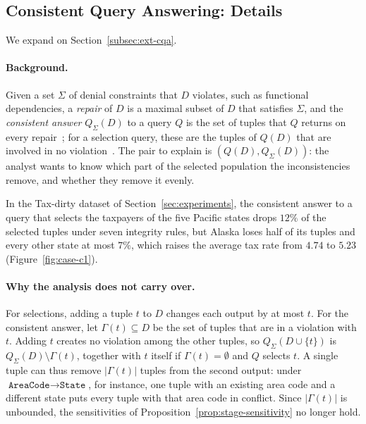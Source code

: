 \subsection{Consistent Query Answering: Details}
\label{app:cqa-details}

We expand on Section~\ref{subsec:ext-cqa}.

\paragraph{Background.}
Given a set $\Sigma$ of denial constraints that $D$ violates, such as functional dependencies, a \emph{repair} of $D$ is a maximal subset of $D$ that satisfies $\Sigma$, and the \emph{consistent answer} $Q_\Sigma(D)$ to a query $Q$ is the set of tuples that $Q$ returns on every repair~\cite{arenas1999,bertossi2006,bertossi2011}; for a selection query, these are the tuples of $Q(D)$ that are involved in no violation~\cite{chomicki2004}.
The pair to explain is $(Q(D),Q_\Sigma(D))$: the analyst wants to know which part of the selected population the inconsistencies remove, and whether they remove it evenly.

\begin{example}
\label{ex:cqa}
In the Tax-dirty dataset of Section~\ref{sec:experiments}, the consistent answer to a query that selects the taxpayers of the five Pacific states drops $12\%$ of the selected tuples under seven integrity rules, but Alaska loses half of its tuples and every other state at most $7\%$, which raises the average tax rate from $4.74$ to $5.23$ (Figure~\ref{fig:case-c1}).
\end{example}

\paragraph{Why the analysis does not carry over.}
For selections, adding a tuple $t$ to $D$ changes each output by at most $t$.
For the consistent answer, let $\Gamma(t)\subseteq D$ be the set of tuples that are in a violation with $t$.
Adding $t$ creates no violation among the other tuples, so $Q_\Sigma(D\cup\{t\})$ is $Q_\Sigma(D)\setminus\Gamma(t)$, together with $t$ itself if $\Gamma(t)=\emptyset$ and $Q$ selects $t$.
A single tuple can thus remove $|\Gamma(t)|$ tuples from the second output: under $\texttt{AreaCode}\to\texttt{State}$, for instance, one tuple with an existing area code and a different state puts every tuple with that area code in conflict.
Since $|\Gamma(t)|$ is unbounded, the sensitivities of Proposition~\ref{prop:stage-sensitivity} no longer hold.

